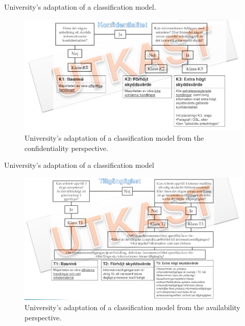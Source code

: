 \documentclass{beamer}
\begin{document}
\begin{frame}{University's adaptation of a classification model.}
  \begin{figure}
    \includegraphics[width=\textwidth]{miun-klassificering.png}
    \caption{University's adaptation of a classification model from the
      confidentiality perspective.}
  \end{figure}
\end{frame}

\begin{frame}{University's adaptation of a classification model}
  \begin{figure}
    \includegraphics[width=\textwidth]{miun-tillganglighet.png}
    \caption{University's adaptation of a classification model from the
      availability perspective.}
  \end{figure}
\end{frame}
\end{document}

